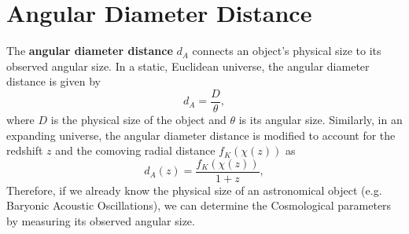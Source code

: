 \section{Angular Diameter Distance}
The \textbf{angular diameter distance} \( d_A \) connects an object's physical size to its observed angular size. In a static, Euclidean universe, the angular diameter distance is given by
\begin{equation}
    d_A = \frac{D}{\theta},
    \label{eq:angular_diameter}
\end{equation}
where \( D \) is the physical size of the object and \( \theta \) is its angular size. Similarly, in an expanding universe, the angular diameter distance is modified to account for the redshift \( z \) and the comoving radial distance \( f_K(\chi(z)) \) as
\begin{equation}
    d_A(z) = \frac{f_K(\chi(z))}{1 + z},
    \label{eq:angular_diameter_distance}
\end{equation}
Therefore, if we already know the physical size of an astronomical object (e.g. Baryonic Acoustic Oscillations), we can determine the Cosmological parameters by measuring its observed angular size.